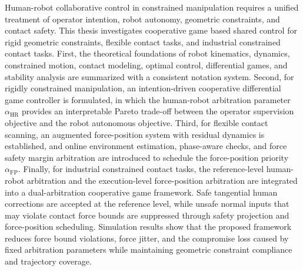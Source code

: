 \begin{abstract*}
Human-robot collaborative control in constrained manipulation requires a unified treatment of operator intention, robot autonomy, geometric constraints, and contact safety. This thesis investigates cooperative game based shared control for rigid geometric constraints, flexible contact tasks, and industrial constrained contact tasks. First, the theoretical foundations of robot kinematics, dynamics, constrained motion, contact modeling, optimal control, differential games, and stability analysis are summarized with a consistent notation system. Second, for rigidly constrained manipulation, an intention-driven cooperative differential game controller is formulated, in which the human-robot arbitration parameter $\alpha_{\mathrm{HR}}$ provides an interpretable Pareto trade-off between the operator supervision objective and the robot autonomous objective. Third, for flexible contact scanning, an augmented force-position system with residual dynamics is established, and online environment estimation, phase-aware checks, and force safety margin arbitration are introduced to schedule the force-position priority $\alpha_{\mathrm{FP}}$. Finally, for industrial constrained contact tasks, the reference-level human-robot arbitration and the execution-level force-position arbitration are integrated into a dual-arbitration cooperative game framework. Safe tangential human corrections are accepted at the reference level, while unsafe normal inputs that may violate contact force bounds are suppressed through safety projection and force-position scheduling. Simulation results show that the proposed framework reduces force bound violations, force jitter, and the compromise loss caused by fixed arbitration parameters while maintaining geometric constraint compliance and trajectory coverage.
\end{abstract*}
